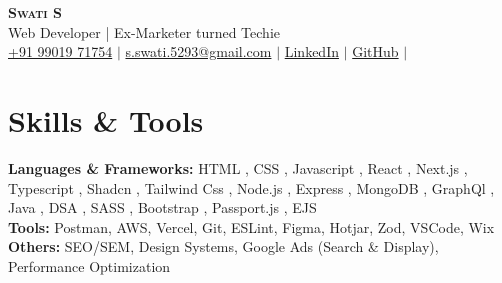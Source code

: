 \documentclass[letterpaper,11pt]{article}
\newcommand{\resumeSubHeadingListStart}{\begin{itemize}[leftmargin=0.15in, label={}]}
\newcommand{\resumeSubHeadingListEnd}{\end{itemize}}
\begin{document}

\begin{center}
  \textbf{\Huge \scshape Swati S} \\ \vspace{2pt}
  \normalsize Web Developer | Ex-Marketer turned Techie \\ \vspace{2pt}
  \small
   \faMobile \hspace{.5pt} \href{tel:+919901971754}{+91 99019 71754}
  $|$
  \faAt \hspace{.5pt} \href{mailto:s.swati.5293@gmail.com}{s.swati.5293@gmail.com}
  $|$
  \faLinkedinSquare \hspace{.5pt} \href{https://www.linkedin.com/in/swatis1/}{LinkedIn}
  $|$
  \faGithub \hspace{.5pt} \href{https://github.com/sswadi}{GitHub}
  $|$
  \faMapMarker \hspace{.5pt}{B'lore, India}
\end{center}


\section{Skills \& Tools}
\vspace{2pt}
\resumeSubHeadingListStart
\small{\item{
              \textbf{Languages \& Frameworks:}{ HTML , CSS , Javascript , React , Next.js , Typescript , Shadcn , Tailwind Css , Node.js , Express , MongoDB , GraphQl , Java , DSA , SASS , Bootstrap , Passport.js , EJS} \\ \vspace{2pt}
              \textbf{Tools:} Postman, AWS, Vercel, Git, ESLint, Figma, Hotjar, Zod, VSCode, Wix\\ \vspace{2pt}
              \textbf{Others:} SEO/SEM, Design Systems, Google Ads (Search \& Display), Performance Optimization
}}
\resumeSubHeadingListEnd

\end{document}
